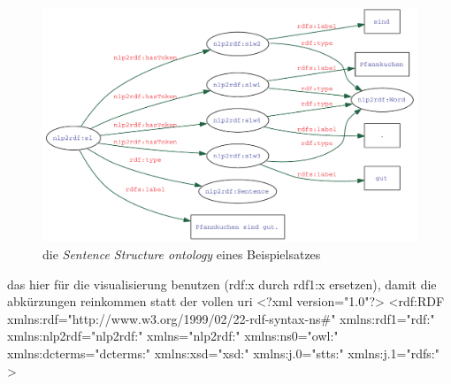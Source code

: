 \begin{figure}
\includegraphics[width=\textwidth]{img/pdf/sso.pdf}
\caption{die \emph{Sentence Structure ontology} eines Beispielsatzes}
\label{fig:nlp2rdf_sso}
\end{figure}

\iffalse
das hier für die visualisierung benutzen (rdf:x durch rdf1:x ersetzen), damit die abkürzungen reinkommen statt der vollen uri
    <?xml version="1.0"?>
<rdf:RDF
    xmlns:rdf="http://www.w3.org/1999/02/22-rdf-syntax-ns#"
    xmlns:rdf1="rdf:"
    xmlns:nlp2rdf="nlp2rdf:"
    xmlns="nlp2rdf:"
    xmlns:ns0="owl:"
    xmlns:dcterms="dcterms:"
    xmlns:xsd="xsd:"
    xmlns:j.0="stts:"
    xmlns:j.1="rdfs:" > 
 

